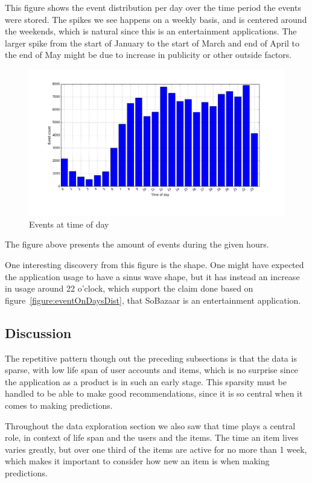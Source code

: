 This figure shows the event distribution per day over the time period the
events were stored.  The spikes we see happens on a weekly basis, and is
centered around the weekends, which is natural since this is an entertainment
applications.  The larger spike from the start of January to the start of March
and end of April to the end of May might be due to increase in publicity or
other outside factors.

\begin{figure}[H]
  \centering
  \includegraphics[width=5in]{image/hrdistribution.png}
  \caption{Events at time of day}
  \label{figure:timeOfDayDistr}
\end{figure}

The figure above presents the amount of events during the given hours.

One interesting discovery from this figure is the shape. One might have
expected the application usage to have a sinus wave shape, but it has instead
an increase in usage around 22 o'clock, which support the claim done based on
figure~\ref{figure:eventOnDaysDist}, that SoBazaar is an entertainment
application.

\subsection{Discussion} The repetitive pattern though out the preceding
subsections is that the data is sparse, with low life span of user accounts and
items, which is no surprise since the application as a product is in such an
early stage.  This sparsity must be handled to be able to make good
recommendations, since it is so central when it comes to making predictions.

Throughout the data exploration section we also saw that time plays a central
role, in context of life span and the users and the items.  The time an item
lives varies greatly, but over one third of the items are active for no more
than 1 week, which makes it important to consider how new an item is when
making predictions.

